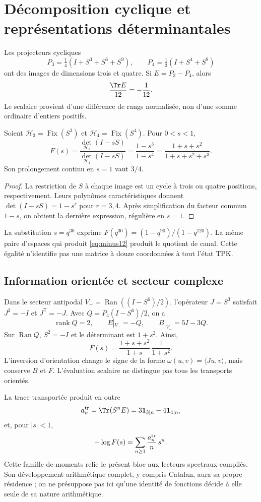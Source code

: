 \section{Décomposition cyclique et représentations déterminantales}
Les projecteurs cycliques
\[
P_3=\tfrac14(I+S^3+S^6+S^9),\qquad
P_4=\tfrac13(I+S^4+S^8)
\]
ont des images de dimensions trois et quatre. Si $E=P_3-P_4$, alors
\begin{equation}
\frac{\Tr E}{12}=-\frac1{12}.
\label{eq:minus12}
\end{equation}
Le scalaire provient d'une différence de rangs normalisée, non d'une
somme ordinaire d'entiers positifs.

\begin{theorem}
Soient $\mathcal H_3=\operatorname{Fix}(S^3)$ et
$\mathcal H_4=\operatorname{Fix}(S^4)$. Pour $0<s<1$,
\begin{equation}
F(s)=\frac{\det_{\mathcal H_3}(I-sS)}{\det_{\mathcal H_4}(I-sS)}
=\frac{1-s^3}{1-s^4}
=\frac{1+s+s^2}{1+s+s^2+s^3}.
\label{eq:det}
\end{equation}
Son prolongement continu en $s=1$ vaut $3/4$.
\end{theorem}
\begin{proof}
La restriction de $S$ à chaque image est un cycle à trois ou quatre
positions, respectivement. Leurs polynômes caractéristiques donnent
$\det(I-sS)=1-s^r$ pour $r=3,4$. Après simplification du facteur commun $1-s$,
on obtient la dernière expression, régulière en $s=1$.
\end{proof}

La substitution $s=q^{30}$ exprime
$F(q^{30})=(1-q^{90})/(1-q^{120})$.
La même paire d’espaces qui produit \eqref{eq:minus12}
produit le quotient de canal. Cette égalité n’identifie pas
une matrice à douze coordonnées à tout l’état TPK.

\subsection{Information orientée et secteur complexe}
Dans le secteur antipodal $V_-=\operatorname{Ran}((I-S^6)/2)$,
l'opérateur $J=S^3$ satisfait $J^2=-I$ et $J^{\mathsf T}=-J$.
Avec $Q=P_4(I-S^6)/2$, on a
\[
\operatorname{rank}Q=2,\qquad E|_{V_-}=-Q,\qquad B|_{V_-}=5I-3Q.
\]
Sur $\operatorname{Ran}Q$, $S^2=-I$ et le déterminant est $1+s^2$.
Ainsi,
\[
F(s)=\frac{1+s+s^2}{1+s}\,\frac1{1+s^2}.
\]
L'inversion d'orientation change le signe de la forme
$\omega(u,v)=\langle Ju,v\rangle$, mais conserve $B$ et $F$.
L'évaluation scalaire ne distingue pas tous les transports orientés.

La trace transportée produit en outre
\[
a_n^{\rm tr}=\Tr(S^nE)=3\mathbf1_{3\mid n}-4\mathbf1_{4\mid n},
\]
et, pour $|s|<1$,
\[
-\log F(s)=\sum_{n\ge1}\frac{a_n^{\rm tr}}n\,s^n.
\]
Cette famille de moments relie le présent bloc aux lecteurs
spectraux compilés. Son développement arithmétique complet, y compris
Catalan, aura sa propre résidence ; on ne présuppose pas ici qu’une
identité de fonctions décide à elle seule de sa nature arithmétique.
